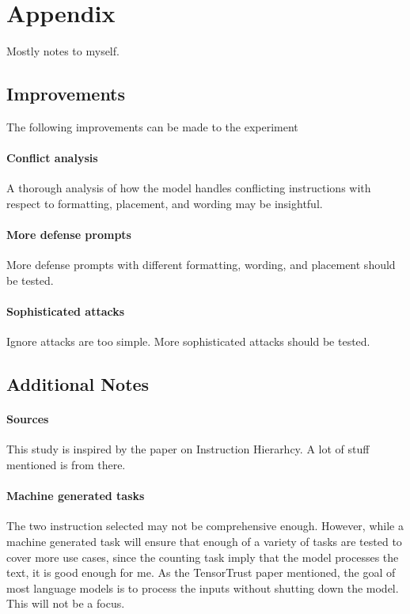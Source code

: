 \section{Appendix}%
\label{sec:Appendix}

Mostly notes to myself.

\subsection{Improvements}

The following improvements can be made to the experiment

\paragraph{Conflict analysis} A thorough analysis of how the model handles
conflicting instructions with respect to formatting, placement, and wording may
be insightful.

\paragraph{More defense prompts} More defense prompts with different formatting,
wording, and placement should be tested.

\paragraph{Sophisticated attacks} Ignore attacks are too simple. More
sophisticated attacks should be tested.


\subsection{Additional Notes}

\paragraph{Sources} This study is inspired by the paper on Instruction
Hierarhcy. A lot of stuff mentioned is from there.

\paragraph{Machine generated tasks} The two instruction selected may not be
comprehensive enough. However, while a machine generated task will ensure that
enough of a variety of tasks are tested to cover more use cases, since the
counting task imply that the model processes the text, it is good enough for me.
As the TensorTrust paper mentioned, the goal of most language models is to
process the inputs without shutting down the model. This will not be a focus.
